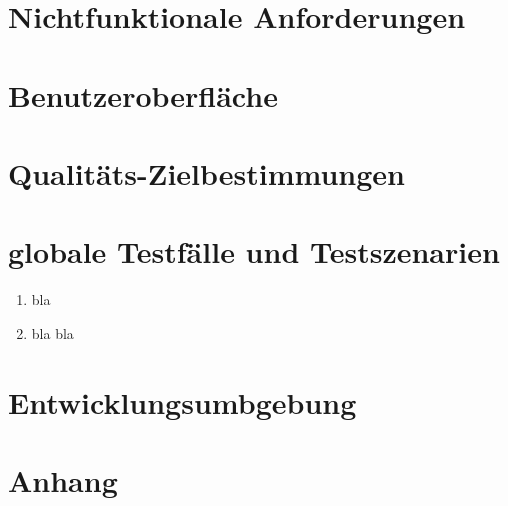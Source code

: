 \documentclass[parskip=full]{scrartcl}
\def\threedigits#1{%
  \ifnum#1<100 0\fi
  \ifnum#1<10 0\fi
  \number#1}
\begin{document}
\section{Nichtfunktionale Anforderungen}

\section{Benutzeroberfläche}

\section{Qualitäts-Zielbestimmungen}

\section{globale Testfälle und Testszenarien}

\begin{enumerate}[label={\textbf{/T\protect\threedigits{\theenumi}0/}}, leftmargin=*]
	\item bla
	\item bla bla
\end{enumerate}

\section{Entwicklungsumbgebung}

\section{Anhang}	
\end{document}
